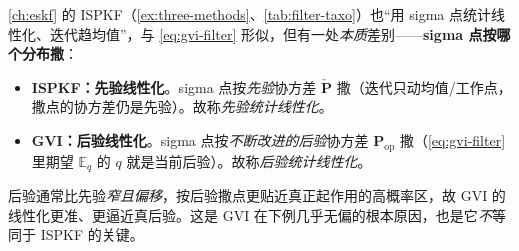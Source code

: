 \begin{insight}
\cref{ch:eskf} 的 ISPKF（\cref{ex:three-methods}、\cref{tab:filter-taxo}）也“用 sigma 点统计线性化、迭代趋均值”，与 \cref{eq:gvi-filter} 形似，但有一处\emph{本质}差别——\textbf{sigma 点按哪个分布撒}：
\begin{itemize}
  \item \textbf{ISPKF：先验线性化}。sigma 点按\emph{先验}协方差 $\check{\mathbf{P}}$ 撒（迭代只动均值/工作点，撒点的协方差仍是先验）。故称\emph{先验统计线性化}。
  \item \textbf{GVI：后验线性化}。sigma 点按\emph{不断改进的后验}协方差 $\mathbf{P}_{\mathrm{op}}$ 撒（\cref{eq:gvi-filter} 里期望 $\mathbb{E}_q$ 的 $q$ 就是当前后验）。故称\emph{后验统计线性化}。
\end{itemize}
后验通常比先验\emph{窄且偏移}，按后验撒点更贴近真正起作用的高概率区，故 GVI 的线性化更准、更逼近真后验。这是 GVI 在下例几乎无偏的根本原因，也是它\emph{不}等同于 ISPKF 的关键\cite{barfoot2024state}。
\end{insight}

